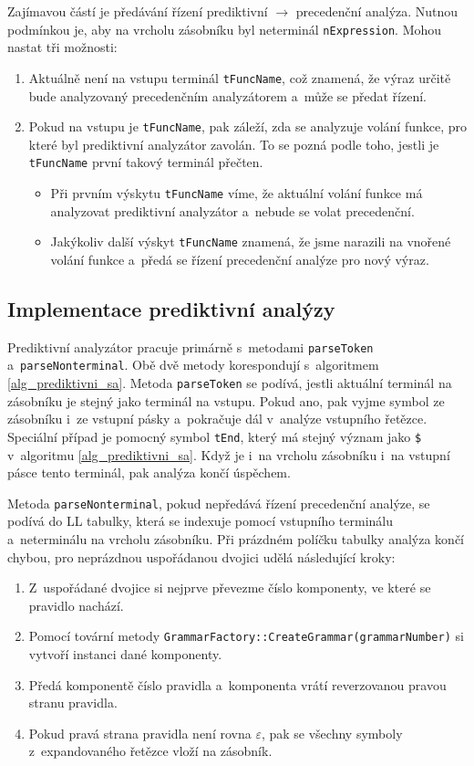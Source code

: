 Zajímavou částí je předávání řízení prediktivní $\rightarrow$ precedenční analýza.
Nutnou podmínkou je, aby na vrcholu zásobníku byl neterminál \texttt{nExpression}.
Mohou nastat tři možnosti:
\begin{enumerate}[label=\arabic*)]
    \item Aktuálně není na vstupu terminál \texttt{tFuncName}, což znamená, že výraz určitě bude analyzovaný precedenčním analyzátorem a~může se předat řízení.
    \item Pokud na vstupu je \texttt{tFuncName}, pak záleží, zda se analyzuje volání funkce, pro které byl prediktivní analyzátor zavolán.
    To se pozná podle toho, jestli je \texttt{tFuncName} první takový terminál přečten. 
    \begin{itemize}
        \item Při prvním výskytu \texttt{tFuncName} víme, že aktuální volání funkce má analyzovat prediktivní analyzátor a~nebude se volat precedenční.
        \item Jakýkoliv další výskyt \texttt{tFuncName} znamená, že jsme narazili na vnořené volání funkce a~předá se řízení precedenční analýze pro nový výraz.
    \end{itemize}  
\end{enumerate}

\subsection*{Implementace prediktivní analýzy}
Prediktivní analyzátor pracuje primárně s~metodami \texttt{parseToken} a~\texttt{parseNonterminal}.
Obě dvě metody korespondují s~algoritmem \ref{alg_prediktivni_sa}.
Metoda \texttt{parseToken} se podívá, jestli aktuální terminál na zásobníku je stejný jako terminál na vstupu.
Pokud ano, pak vyjme symbol ze zásobníku i~ze vstupní pásky a~pokračuje dál v~analýze vstupního řetězce.
Speciální případ je pomocný symbol \texttt{tEnd}, který má stejný význam jako \texttt{\$} v~algoritmu \ref{alg_prediktivni_sa}.
Když je i~na vrcholu zásobníku i~na vstupní pásce tento terminál, pak analýza končí úspěchem.

Metoda \texttt{parseNonterminal}, pokud nepředává řízení precedenční analýze, se podívá do LL tabulky, která se indexuje pomocí vstupního terminálu a~neterminálu na vrcholu zásobníku.
Při prázdném políčku tabulky analýza končí chybou, pro neprázdnou uspořádanou dvojici udělá následující kroky:
\begin{enumerate}[label=\arabic*)]
    \item Z~uspořádané dvojice si nejprve převezme číslo komponenty, ve které se pravidlo nachází.
    \item Pomocí tovární metody \texttt{GrammarFactory::CreateGrammar(grammarNumber)} si vytvoří instanci dané komponenty.
    \item Předá komponentě číslo pravidla a~komponenta vrátí reverzovanou pravou stranu pravidla.
    \item Pokud pravá strana pravidla není rovna $\varepsilon$, pak se všechny symboly z~expandovaného řetězce vloží na zásobník.
\end{enumerate}

